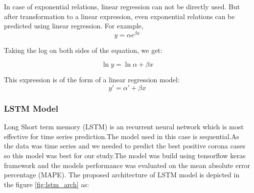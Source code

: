 In case of exponential relations, linear regression can not be directly used.
But after transformation to a linear expression, even exponential relations can
be predicted using linear regression. For example,
\begin{equation}
	y = \alpha e^{\beta x}
\end{equation}

Taking the log on both sides of the equation, we get:

\begin{equation}
	\ln y = \ln \alpha + \beta x
\end{equation}

This expression is of the form of a linear regression model:
\begin{equation}
	y\prime = \alpha \prime + \beta x
\end{equation}



\subsubsection{LSTM Model}

Long Short term memory (LSTM) is an recurrent neural network which is most effective for time
series prediction.The model used in this case is sequential.As the data was time series and
we needed to predict the best positive corona cases so this model was best for our study.The
model was build using tensorflow keras framework and the models performance was
evaluated on the mean absolute error percentage (MAPE).
The proposed architecture of LSTM model is depicted in the figure
\ref{fig:lstm_arch} as:


